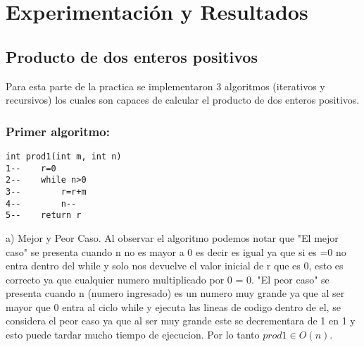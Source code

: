 \documentclass[12pt,twoside]{article}
\begin{document}
\section{Experimentaci\'on y Resultados}

\subsection{Producto de dos enteros positivos}
Para esta parte de la practica se implementaron 3 algoritmos (iterativos y recursivos) los cuales son capaces de calcular el producto de dos enteros positivos.
\newline
\subsubsection{Primer algoritmo:}
\begin{lstlisting}
int prod1(int m, int n)
1--    r=0
2--    while n>0
3--        r=r+m
4--        n--
5--    return r
\end{lstlisting}
\newline
\begin{enumerate} a) Mejor y Peor Caso. \newline\newline
Al observar el algoritmo podemos notar que "El mejor caso" se presenta cuando n no es mayor a 0 es decir es igual ya que si es =0 no entra dentro del while y solo nos devuelve el valor inicial de r que es 0, esto es correcto ya que cualquier numero multiplicado por 0 = 0. \newline
"El peor caso" se presenta cuando n (numero ingresado) es un n\´umero muy grande ya que al ser  mayor que 0 entra al ciclo while y ejecuta las lineas de codigo dentro de el, se considera el peor caso ya que al ser muy grande este se decrementar\´a de 1 en 1 y esto puede tardar mucho tiempo de ejecuci\´on. Por lo tanto $prod1 \in O(n)$.
\end{enumerate}
\end{document}
